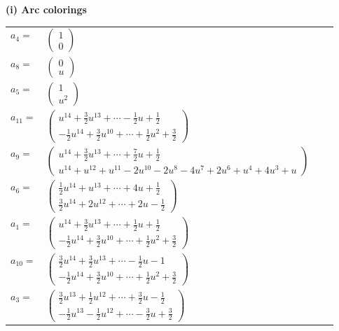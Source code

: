 \documentclass[1p]{elsarticle_modified}
\theoremstyle{definition}
\begin{document}
\flushleft \textbf{(i) Arc colorings}\\
\begin{tabular}{m{7pt} m{180pt} m{7pt} m{180pt} }
\flushright $a_{4}=$&$\begin{pmatrix}1\\0\end{pmatrix}$ \\
\flushright $a_{8}=$&$\begin{pmatrix}0\\u\end{pmatrix}$ \\
\flushright $a_{5}=$&$\begin{pmatrix}1\\u^2\end{pmatrix}$ \\
\flushright $a_{11}=$&$\begin{pmatrix}u^{14}+\frac{3}{2} u^{13}+\cdots-\frac{1}{2} u+\frac{1}{2}\\-\frac{1}{2} u^{14}+\frac{3}{2} u^{10}+\cdots+\frac{1}{2} u^2+\frac{3}{2}\end{pmatrix}$ \\
\flushright $a_{9}=$&$\begin{pmatrix}u^{14}+\frac{3}{2} u^{13}+\cdots+\frac{7}{2} u+\frac{1}{2}\\u^{14}+u^{12}+u^{11}-2 u^{10}-2 u^8-4 u^7+2 u^6+u^4+4 u^3+u\end{pmatrix}$ \\
\flushright $a_{6}=$&$\begin{pmatrix}\frac{1}{2} u^{14}+u^{13}+\cdots+4 u+\frac{1}{2}\\\frac{3}{2} u^{14}+2 u^{12}+\cdots+2 u-\frac{1}{2}\end{pmatrix}$ \\
\flushright $a_{1}=$&$\begin{pmatrix}u^{14}+\frac{3}{2} u^{13}+\cdots+\frac{1}{2} u+\frac{1}{2}\\-\frac{1}{2} u^{14}+\frac{3}{2} u^{10}+\cdots+\frac{1}{2} u^2+\frac{3}{2}\end{pmatrix}$ \\
\flushright $a_{10}=$&$\begin{pmatrix}\frac{3}{2} u^{14}+\frac{3}{2} u^{13}+\cdots-\frac{1}{2} u-1\\-\frac{1}{2} u^{14}+\frac{3}{2} u^{10}+\cdots+\frac{1}{2} u^2+\frac{3}{2}\end{pmatrix}$ \\
\flushright $a_{3}=$&$\begin{pmatrix}\frac{3}{2} u^{13}+\frac{1}{2} u^{12}+\cdots+\frac{3}{2} u-\frac{1}{2}\\-\frac{1}{2} u^{13}-\frac{1}{2} u^{12}+\cdots-\frac{3}{2} u+\frac{3}{2}\end{pmatrix}$ \\

\end{tabular}
\end{document}
